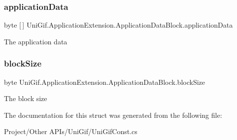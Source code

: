 \subsubsection{\texorpdfstring{application\+Data}{applicationData}}
{\footnotesize\ttfamily byte \mbox{[}$\,$\mbox{]} Uni\+Gif.\+Application\+Extension.\+Application\+Data\+Block.\+application\+Data}



The application data 

\mbox{\label{struct_uni_gif_1_1_application_extension_1_1_application_data_block_ad821970f8342c9a6c8c59fa213cac604}} 
\subsubsection{\texorpdfstring{block\+Size}{blockSize}}
{\footnotesize\ttfamily byte Uni\+Gif.\+Application\+Extension.\+Application\+Data\+Block.\+block\+Size}



The block size 



The documentation for this struct was generated from the following file\+:\begin{DoxyCompactItemize}
\item 
Project/\+Other A\+P\+Is/\+Uni\+Gif/Uni\+Gif\+Const.\+cs\end{DoxyCompactItemize}
